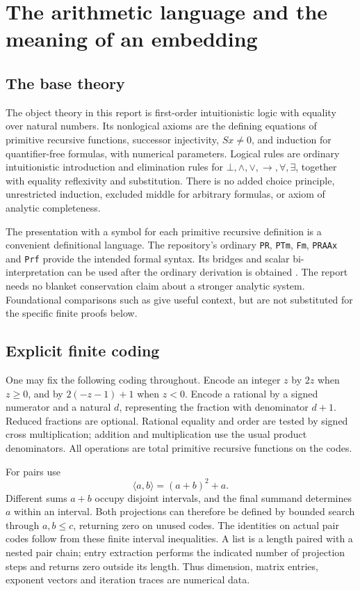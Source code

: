 \section{The arithmetic language and the meaning of an embedding}
\label{sec:arithmetic}

\subsection{The base theory}

The object theory in this report is first-order intuitionistic logic with
equality over natural numbers. Its nonlogical axioms are the defining
equations of primitive recursive functions, successor injectivity,
\(Sx\ne0\), and induction for quantifier-free formulas, with numerical
parameters. Logical rules are ordinary intuitionistic introduction and
elimination rules for \(\bot,\wedge,\vee,\to,\forall,\exists\), together
with equality reflexivity and substitution. There is no added choice
principle, unrestricted induction, excluded middle for arbitrary
formulas, or axiom of analytic completeness.

The presentation with a symbol for each primitive recursive definition is
a convenient definitional language. The repository's ordinary
\texttt{PR}, \texttt{PTm}, \texttt{Fm}, \texttt{PRAAx} and \texttt{Prf}
provide the intended formal syntax. Its bridges and scalar
bi-interpretation can be used after the ordinary derivation is obtained
\cite{audit-unification}. The report needs no blanket conservation claim
about a stronger analytic system. Foundational comparisons such as
\cite{fefermanstrahm} give useful context, but are not substituted for the
specific finite proofs below.

\subsection{Explicit finite coding}

One may fix the following coding throughout. Encode an integer \(z\) by
\(2z\) when \(z\ge0\), and by \(2(-z-1)+1\) when \(z<0\).
Encode a rational by a signed numerator and a natural \(d\), representing
the fraction with denominator \(d+1\). Reduced fractions are optional.
Rational equality and order are tested by signed cross multiplication;
addition and multiplication use the usual product denominators. All
operations are total primitive recursive functions on the codes.

For pairs use
\[
 \langle a,b\rangle=(a+b)^2+a.
\]
Different sums \(a+b\) occupy disjoint intervals, and the final summand
determines \(a\) within an interval. Both projections can therefore be
defined by bounded search through \(a,b\le c\), returning zero on unused
codes. The identities on actual pair codes follow from these finite
interval inequalities. A list is a length paired with a nested pair
chain; entry extraction performs the indicated number of projection
steps and returns zero outside its length. Thus dimension, matrix
entries, exponent vectors and iteration traces are numerical data.

